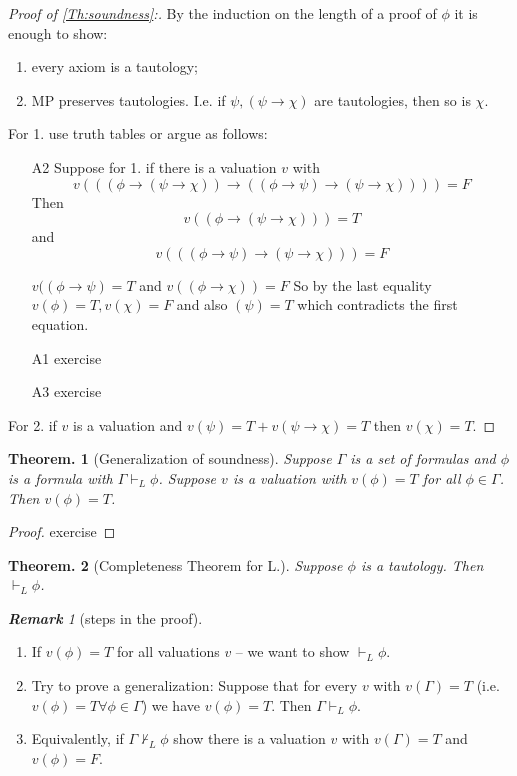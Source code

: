 \documentclass[a4paper,oneside,11pt,DIV=12,parskip=half]{scrartcl}
\theoremstyle{plain}
\newtheorem{theorem}{Theorem.}[section]
\theoremstyle{definition}
\newtheorem{remark, definition}[theorem]{Remark and Definition.}
\newtheorem{lemma, definition}[theorem]{Lemma and Definition.}
\newtheorem{theorem, definition}[theorem]{Theorem and Definition.}
\theoremstyle{remark}
\newtheorem*{remark}{\textbf{Remark}}
\newtheorem*{remark, example}{\textbf{Remark and Exercise}}
\begin{document}
\begin{proof}[Proof of \ref{Th:soundness}:] By the induction on the length of a proof of $\phi$ it is enough to show:
\begin{enumerate}
    \item every axiom is a tautology;
    \item MP preserves tautologies. I.e. if $\psi,(\psi \rightarrow \chi)$ are tautologies, then so is $\chi$.
\end{enumerate}
For 1. use truth tables or argue as follows:
\begin{itemize}
    \item [A2] Suppose for 1. if there is a valuation $v$ with \[ v(((\phi \rightarrow (\psi \rightarrow \chi)) \rightarrow ((\phi \rightarrow \psi) \rightarrow (\psi \rightarrow \chi)))) = F \]
    Then \[ v((\phi \rightarrow (\psi \rightarrow \chi))) = T \] and 
        \[ v(((\phi \rightarrow \psi) \rightarrow (\psi \rightarrow \chi))) = F \]
    
    $v((\phi \rightarrow \psi) = T$ and $v((\phi \rightarrow \chi)) = F$
    So by the last equality $v(\phi) = T, v(\chi) = F$ and also $(\psi) = T$ which contradicts the first equation.
    \item[A1] exercise
    \item[A3] exercise
\end{itemize}
For 2. if $v$ is a valuation and $v(\psi) = T + v(\psi \rightarrow \chi) = T$ then $v(\chi) = T$.

\end{proof}

\begin{theorem}[Generalization of soundness]

Suppose $\Gamma$ is a set of formulas and $\phi$ is a formula with $\Gamma \vdash_L \phi$. Suppose $v$ is a valuation with $v(\phi) = T$ for all $\phi \in \Gamma$. Then $v(\phi) = T$.
\end{theorem}
\begin{proof}
exercise
\end{proof}

\begin{theorem}[Completeness Theorem for L.]
Suppose $\phi$ is a tautology. Then $\vdash_L \phi$.

\end{theorem}

\begin{remark}[steps in the proof]
\begin{enumerate}
    \item 
 If $v(\phi) = T$ for all valuations $v$ -- we want to show $\vdash_L \phi$.
    \item Try to prove a generalization: Suppose that for every $v$ with $v(\Gamma) = T$ (i.e. $v(\phi) = T \forall \phi \in \Gamma$) we have $v(\phi) = T$. Then $\Gamma \vdash_L \phi$.
    \item Equivalently, if $\Gamma \not \vdash_L \phi$ show there is a valuation $v$ with $v(\Gamma) = T$ and $v(\phi) = F$.
\end{enumerate}
\end{remark}
\end{document}
